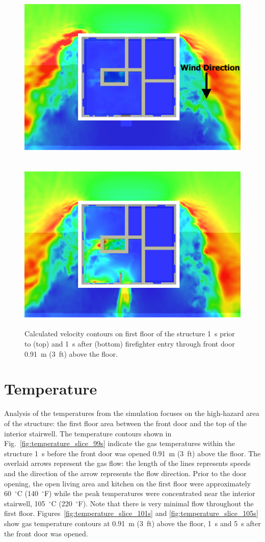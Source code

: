 \documentclass[12pt,oneside]{book}
\begin{document}
\begin{figure}[!ht]
\includegraphics[trim = 0in 1in 0in 1in, clip=true, width=.65\textwidth]{../Figures/velocity_slice_99s}

 \\
\includegraphics[trim = 0in 1in 0in 1in, clip=true, width=.65\textwidth]{../Figures/velocity_slice_101s}


\caption[Calculated velocity on first floor 1~s before and after front door opens]
{Calculated velocity contours on first floor of the structure 1~s prior to (top) and 1~s after (bottom) firefighter entry through front door 0.91~m (3~ft) above the floor.}
\label{fig:velocity_slices}
\end{figure}

\clearpage

\section{Temperature}
\label{temp}

Analysis of the temperatures from the simulation focuses on the high-hazard area of the structure: the first floor area between the front door and the top of the interior stairwell. The temperature contours shown in Fig.~\ref{fig:temperature_slice_99s} indicate the gas temperatures within the structure 1~s before the front door was opened 0.91~m (3~ft) above the floor. The overlaid arrows represent the gas flow: the length of the lines represents speeds and the direction of the arrow represents the flow direction. Prior to the door opening, the open living area and kitchen on the first floor were approximately 60~$^{\circ}$C (140~$^{\circ}$F) while the peak temperatures were concentrated near the interior stairwell, 105~$^{\circ}$C (220~$^{\circ}$F). Note that there is very minimal flow throughout the first floor. Figures~\ref{fig:temperature_slice_101s} and \ref{fig:temperature_slice_105s} show gas temperature contours at 0.91~m (3~ft) above the floor, 1~s and 5~s after the front door was opened.
\end{document}

